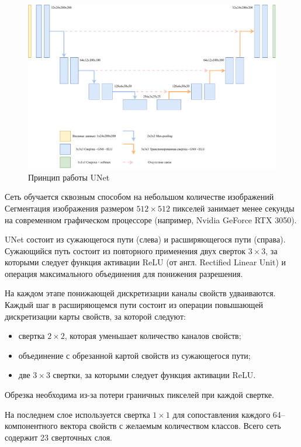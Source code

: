 \begin{figure}[H]
	\centering
	\includegraphics[width=\textwidth]{img/unet.pdf}
	\caption{Принцип работы UNet}
	\label{fig:unet}
\end{figure}

Сеть обучается сквозным способом на небольшом количестве изображений Сегментация изображения размером $512 \times 512$ пикселей занимает менее секунды на современном графическом процессоре (например, Nvidia GeForce RTX 3050).

UNet состоит из сужающегося пути (слева) и расширяющегося пути (справа). Сужающийся путь состоит из повторного применения двух сверток $3 \times 3$, за которыми следует функция активации ReLU (от англ. Rectified Linear Unit) и операция максимального объединения для понижения разрешения.

На каждом этапе понижающей дискретизации каналы свойств удваиваются. Каждый шаг в расширяющемся пути состоит из операции повышающей дискретизации карты свойств, за которой следуют:
\begin{itemize}
	\item свертка $2 \times 2$, которая уменьшает количество каналов свойств;
	\item объединение с обрезанной картой свойств из сужающегося пути;
	\item две $3 \times 3$ свертки, за которыми следует функция активации ReLU.
\end{itemize}

Обрезка необходима из-за потери граничных пикселей при каждой свертке.

На последнем слое используется свертка $1 \times 1$ для сопоставления каждого 64--компонентного вектора свойств с желаемым количеством классов. Всего сеть содержит 23 сверточных слоя.

